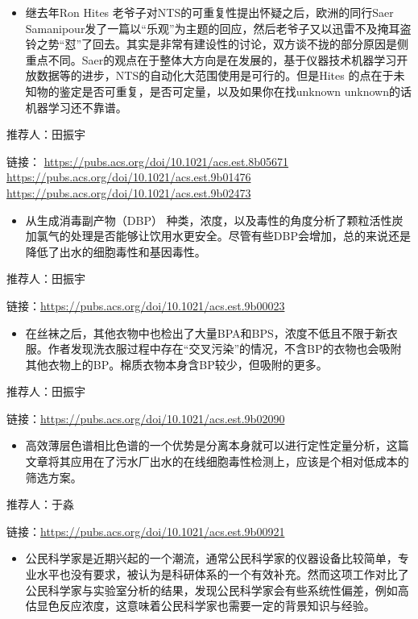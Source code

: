 \documentclass[]{book}
\providecommand{\tightlist}{%
  \setlength{\itemsep}{0pt}\setlength{\parskip}{0pt}}
\begin{document}
\begin{itemize}
\tightlist
\item
  继去年Ron Hites 老爷子对NTS的可重复性提出怀疑之后，欧洲的同行Saer Samanipour发了一篇以``乐观''为主题的回应，然后老爷子又以迅雷不及掩耳盗铃之势``怼''了回去。其实是非常有建设性的讨论，双方谈不拢的部分原因是侧重点不同。Saer的观点在于整体大方向是在发展的，基于仪器技术机器学习开放数据等的进步，NTS的自动化大范围使用是可行的。但是Hites 的点在于未知物的鉴定是否可重复，是否可定量，以及如果你在找unknown unknown的话机器学习还不靠谱。
\end{itemize}

推荐人：田振宇

链接：
\url{https://pubs.acs.org/doi/10.1021/acs.est.8b05671}
\url{https://pubs.acs.org/doi/10.1021/acs.est.9b01476}
\url{https://pubs.acs.org/doi/10.1021/acs.est.9b02473}

\begin{itemize}
\tightlist
\item
  从生成消毒副产物（DBP） 种类，浓度，以及毒性的角度分析了颗粒活性炭加氯气的处理是否能够让饮用水更安全。尽管有些DBP会增加，总的来说还是降低了出水的细胞毒性和基因毒性。
\end{itemize}

推荐人：田振宇

链接：\url{https://pubs.acs.org/doi/10.1021/acs.est.9b00023}

\begin{itemize}
\tightlist
\item
  在丝袜之后，其他衣物中也检出了大量BPA和BPS，浓度不低且不限于新衣服。作者发现洗衣服过程中存在``交叉污染''的情况，不含BP的衣物也会吸附其他衣物上的BP。棉质衣物本身含BP较少，但吸附的更多。
\end{itemize}

推荐人：田振宇

链接：\url{https://pubs.acs.org/doi/10.1021/acs.est.9b02090}

\begin{itemize}
\tightlist
\item
  高效薄层色谱相比色谱的一个优势是分离本身就可以进行定性定量分析，这篇文章将其应用在了污水厂出水的在线细胞毒性检测上，应该是个相对低成本的筛选方案。
\end{itemize}

推荐人：于淼

链接：\url{https://pubs.acs.org/doi/10.1021/acs.est.9b00921}

\begin{itemize}
\tightlist
\item
  公民科学家是近期兴起的一个潮流，通常公民科学家的仪器设备比较简单，专业水平也没有要求，被认为是科研体系的一个有效补充。然而这项工作对比了公民科学家与实验室分析的结果，发现公民科学家会有些系统性偏差，例如高估显色反应浓度，这意味着公民科学家也需要一定的背景知识与经验。
\end{itemize}
\end{document}

